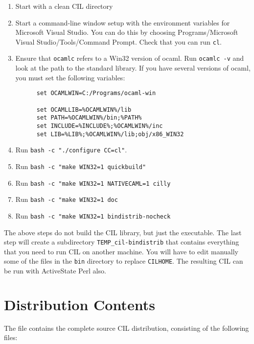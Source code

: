 \documentclass[letterpaper]{article}
\def\t#1{{\tt #1}}
\begin{document}
\begin{enumerate}
\item Start with a clean CIL directory
\item Start a command-line window setup with the environment variables for
  Microsoft Visual Studio. You can do this by choosing Programs/Microsoft
  Visual Studio/Tools/Command Prompt. Check that you can run \t{cl}. 
\item Ensure that \t{ocamlc} refers to a Win32 version of ocaml. Run \t{ocamlc
  -v} and look at the path to the standard library. If you have several
  versions of ocaml, you must set the following variables:
   \begin{verbatim}
      set OCAMLWIN=C:/Programs/ocaml-win

      set OCAMLLIB=%OCAMLWIN%/lib
      set PATH=%OCAMLWIN%/bin;%PATH%
      set INCLUDE=%INCLUDE%;%OCAMLWIN%/inc
      set LIB=%LIB%;%OCAMLWIN%/lib;obj/x86_WIN32
   \end{verbatim}

\item Run \t{bash -c "./configure CC=cl"}.
\item Run \t{bash -c "make WIN32=1 quickbuild"}
\item Run \t{bash -c "make WIN32=1 NATIVECAML=1 cilly}
\item Run \t{bash -c "make WIN32=1 doc}
\item Run \t{bash -c "make WIN32=1 bindistrib-nocheck}
\end{enumerate}

 The above steps do not build the CIL library, but just the executable. The
last step will create a subdirectory \t{TEMP\_cil-bindistrib} that contains
everything that you need to run CIL on another machine. You will have to edit
manually some of the files in the \t{bin} directory to replace \t{CILHOME}.
The resulting CIL can be run with ActiveState Perl also. 


  \section{Distribution Contents}

The file  
contains the complete source CIL distribution, 
consisting of the following files:
\end{document}
